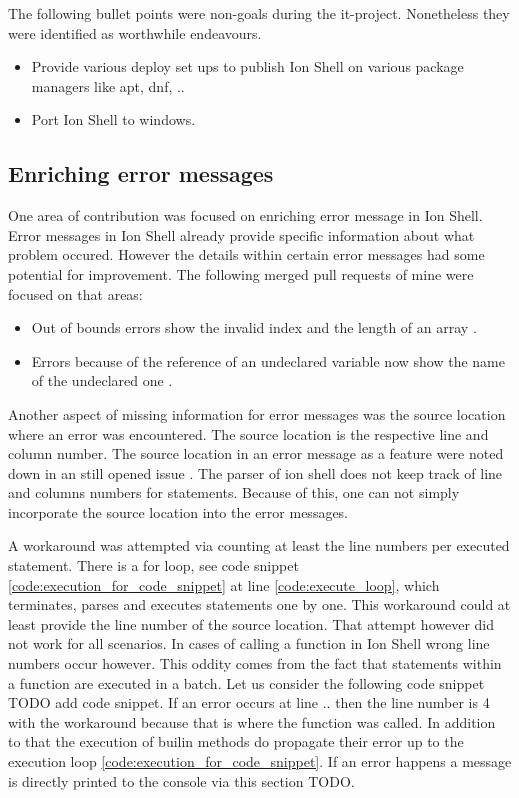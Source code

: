 The following bullet points were non-goals during the it-project. Nonetheless they were identified as worthwhile endeavours.

\begin{itemize}
	\item Provide various deploy set ups to publish Ion Shell on various package managers like apt, dnf, ..
	\item Port Ion Shell to windows.
\end{itemize}

\subsection{Enriching error messages}

One area of contribution was focused on enriching error message in Ion Shell.
Error messages in Ion Shell already provide specific information about what problem occured.
However the details within certain error messages had some potential for improvement.
The following merged pull requests of mine were focused on that areas:

\begin{itemize}
	\item Out of bounds errors show the invalid index and the length of an array \cite{pr_error_message_shows_invalid_range}.
	\item Errors because of the reference of an undeclared variable now show the name of the undeclared one \cite{pr_better_not_found_variable_show}.
\end{itemize}

Another aspect of missing information for error messages was the source location where an error was encountered.
The source location is the respective line and column number.
The source location in an error message as a feature were noted down in an still opened issue \cite{issue_enrich_error_message_information}.
The parser of ion shell does not keep track of line and columns numbers for statements.
Because of this, one can not simply incorporate the source location into the error messages.

A workaround was attempted via counting at least the line numbers per executed statement.
There is a for loop, see code snippet \ref{code:execution_for_code_snippet} at line \ref{code:execute_loop},
which terminates, parses and executes statements one by one.
This workaround could at least provide the line number of the source location.
That attempt however did not work for all scenarios.
In cases of calling a function in Ion Shell wrong line numbers occur however.
This oddity comes from the fact that statements within a function are executed in a batch.
Let us consider the following code snippet TODO add code snippet.
If an error occurs at line .. then the line number is 4 with the workaround because that is where the function was called.
In addition to that the execution of builin methods do propagate their error up to the execution loop \ref{code:execution_for_code_snippet}.
If an error happens a message is directly printed to the console via this section TODO.

